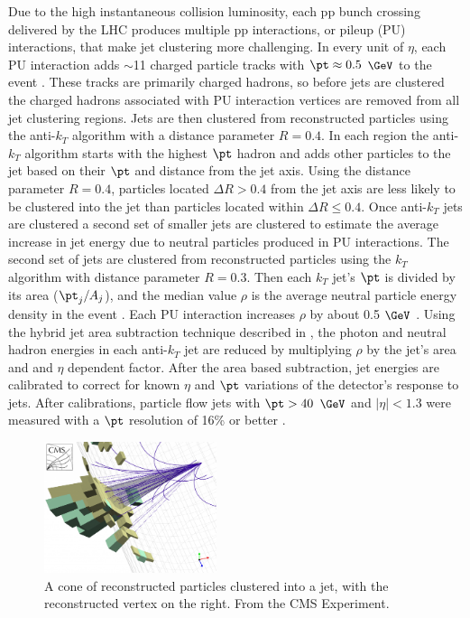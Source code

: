 Due to the high instantaneous collision luminosity, each pp bunch crossing delivered by the LHC produces multiple pp interactions, 
or pileup (PU) interactions, that make jet clustering more challenging.  In every unit of $\eta$, each PU interaction adds 
$\sim$11 charged particle tracks with $\pt \approx 0.5$ $\GeV$ to the event \cite{chgdHdrMultInData}.  These tracks are primarily 
charged hadrons, so before jets are clustered the charged hadrons associated with PU interaction vertices are removed from 
all jet clustering regions.  Jets are then clustered from reconstructed particles using the anti-$k_{T}$ algorithm \cite{antikt} 
with a distance parameter $R = 0.4$.  In each region the anti-$k_{T}$ algorithm starts with the highest $\pt$ hadron and adds 
other particles to the jet based on their $\pt$ and distance from the jet axis.  Using the distance parameter $R = 0.4$, 
particles located $\Delta R > 0.4$ from the jet axis are less likely to be clustered into the jet than particles located within 
$\Delta R \leq 0.4$.  Once anti-$k_{T}$ jets are clustered a second set of smaller jets are clustered to estimate the average 
increase in jet energy due to neutral particles produced in PU interactions.  The second set of jets are clustered from 
reconstructed particles using the $k_{T}$ algorithm \cite{ktAlgoOne,ktAlgoTwo,ktAlgoThree} with distance parameter $R = 0.3$.  
Then each $k_{T}$ jet's $\pt$ is divided by its area ($\pt_{j} / A_{j}$), and the median value $\rho$ is the average neutral 
particle energy density in the event \cite{pileup1,pileup2}.  Each PU interaction increases $\rho$ by about 0.5 $\GeV$ 
\cite{jetResolutionInCollisions}.  Using the hybrid jet area subtraction technique described in \cite{pflowJetRecoInCollisions}, 
the photon and neutral hadron energies in each anti-$k_{T}$ jet are reduced by multiplying $\rho$ by the jet's area and and $\eta$ 
dependent factor.  After the area based subtraction, jet energies are calibrated to correct for known $\eta$ and $\pt$ variations 
of the detector's response to jets.  After calibrations, particle flow jets with $\pt > 40$ $\GeV$ and $|\eta| < 1.3$ were 
measured with a $\pt$ resolution of 16\% or better \cite{jetResolutionInCollisions}.

\begin{figure}[h]
	\centering
	\includegraphics[width=0.45\textwidth]{figures/jetClusteringInCMS.png}
	\caption{A cone of reconstructed particles clustered into a jet, with the reconstructed vertex on the right.  
	From the CMS Experiment.}
	\label{fig:jetClustering}
\end{figure}

